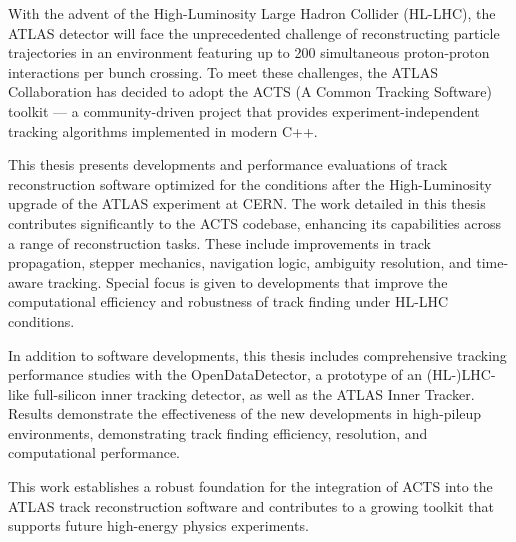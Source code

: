 With the advent of the High-Luminosity Large Hadron Collider (HL-LHC), the ATLAS detector will face the unprecedented challenge of reconstructing particle trajectories in an environment featuring up to 200 simultaneous proton-proton interactions per bunch crossing. To meet these challenges, the ATLAS Collaboration has decided to adopt the ACTS (A Common Tracking Software) toolkit --- a community-driven project that provides experiment-independent tracking algorithms implemented in modern C++.

This thesis presents developments and performance evaluations of track reconstruction software optimized for the conditions after the High-Luminosity upgrade of the ATLAS experiment at CERN. The work detailed in this thesis contributes significantly to the ACTS codebase, enhancing its capabilities across a range of reconstruction tasks. These include improvements in track propagation, stepper mechanics, navigation logic, ambiguity resolution, and time-aware tracking. Special focus is given to developments that improve the computational efficiency and robustness of track finding under HL-LHC conditions.

In addition to software developments, this thesis includes comprehensive tracking performance studies with the OpenDataDetector, a prototype of an (HL-)LHC-like full-silicon inner tracking detector, as well as the ATLAS Inner Tracker. Results demonstrate the effectiveness of the new developments in high-pileup environments, demonstrating track finding efficiency, resolution, and computational performance.

This work establishes a robust foundation for the integration of ACTS into the ATLAS track reconstruction software and contributes to a growing toolkit that supports future high-energy physics experiments.
